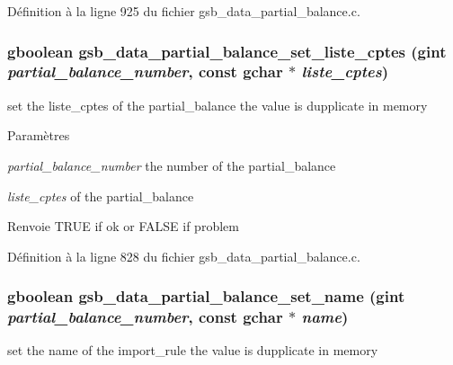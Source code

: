 Définition à la ligne 925 du fichier gsb\_\-data\_\-partial\_\-balance.c.

\subsubsection[{gsb\_\-data\_\-partial\_\-balance\_\-set\_\-liste\_\-cptes}]{\setlength{\rightskip}{0pt plus 5cm}gboolean gsb\_\-data\_\-partial\_\-balance\_\-set\_\-liste\_\-cptes (gint {\em partial\_\-balance\_\-number}, \/  const gchar $\ast$ {\em liste\_\-cptes})}\label{gsb__data__partial__balance_8c_a84f976f707046b30d436a82a94921441}
set the liste\_\-cptes of the partial\_\-balance the value is dupplicate in memory


\begin{DoxyParams}{Paramètres}
\item[{\em partial\_\-balance\_\-number}]the number of the partial\_\-balance \item[{\em liste\_\-cptes}]of the partial\_\-balance\end{DoxyParams}
\begin{DoxyReturn}{Renvoie}
TRUE if ok or FALSE if problem 
\end{DoxyReturn}


Définition à la ligne 828 du fichier gsb\_\-data\_\-partial\_\-balance.c.

\subsubsection[{gsb\_\-data\_\-partial\_\-balance\_\-set\_\-name}]{\setlength{\rightskip}{0pt plus 5cm}gboolean gsb\_\-data\_\-partial\_\-balance\_\-set\_\-name (gint {\em partial\_\-balance\_\-number}, \/  const gchar $\ast$ {\em name})}\label{gsb__data__partial__balance_8c_ae2945c54476e4bdd915ec04fd8d5d899}
set the name of the import\_\-rule the value is dupplicate in memory



